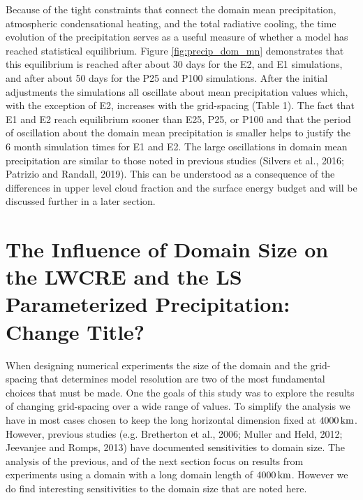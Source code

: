 \documentclass[11pt]{article}   	%
\begin{document}
Because of the tight constraints that connect the domain mean precipitation, atmospheric condensational heating, and 
the total radiative cooling, the time evolution of the precipitation serves as a useful measure of whether a model has 
reached statistical equilibrium.  Figure \ref{fig:precip_dom_mn} demonstrates that this equilibrium is reached after about 30 
days for the E2, and E1 simulations, and after about 50 days for the P25 and P100 simulations.   After the initial adjustments
the simulations all oscillate about mean precipitation values which, with the exception of E2, increases with the grid-spacing 
(Table 1).   The fact that E1 and E2 reach equilibrium sooner than E25, P25, or P100 and that the period of oscillation 
about the domain mean precipitation is smaller helps to justify the 6 month simulation times for E1 and E2.  
The large oscillations in domain mean precipitation are similar to those noted in previous studies 
(Silvers et al., 2016; Patrizio and Randall, 2019).   
This can be understood as a consequence
of the differences in upper level cloud fraction and the surface energy budget 
and will be discussed further in a later section.   



\section{The Influence of Domain Size on the LWCRE and the LS Parameterized Precipitation: Change Title?}

When designing numerical experiments the size of the domain and the grid-spacing that determines model resolution are 
two of the most fundamental choices that must be made.   One the goals of this study was to explore the results of 
changing grid-spacing over a wide range of values.  To simplify the analysis we have in most cases chosen to keep the 
long horizontal dimension fixed at $4000\, \rm{km}$.  However, previous studies 
(e.g. Bretherton et al., 2006; Muller and Held, 2012; Jeevanjee and Romps, 2013) have documented sensitivities to domain 
size.   The analysis of the previous, and of the next section focus on results from experiments using
a domain with a long domain length of $4000 \, \rm{km}$.  However we do find interesting sensitivities to the domain size that are noted here. 
\end{document}

